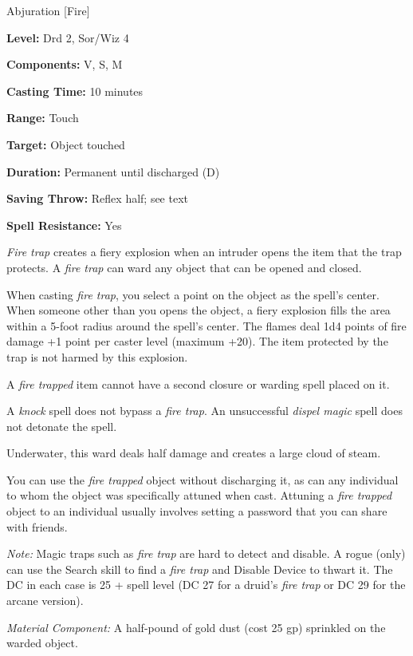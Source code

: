 
Abjuration [Fire]

\textbf{Level:} Drd 2, Sor/Wiz 4

\textbf{Components:} V, S, M

\textbf{Casting Time:} 10 minutes

\textbf{Range:} Touch

\textbf{Target:} Object touched

\textbf{Duration:} Permanent until discharged (D)

\textbf{Saving Throw:} Reflex half; see text

\textbf{Spell Resistance:} Yes

\textit{Fire trap} creates a fiery explosion when an intruder opens the item that 
the trap protects. A \textit{fire trap} can ward any object that can be opened 
and closed.

When casting \textit{fire trap}, you select a point on the object as the spell's 
center. When someone other than you opens the object, a fiery explosion fills the 
area within a 5-foot radius around the spell's center. The flames deal 1d4 points 
of fire damage +1 point per caster level (maximum +20). The item protected by the 
trap is not harmed by this explosion.

A \textit{fire trapped} item cannot have a second closure or warding spell placed 
on it.

A \textit{knock} spell does not bypass a \textit{fire trap}.  An unsuccessful \textit{dispel 
magic} spell does not detonate the spell.

Underwater, this ward deals half damage and creates a large cloud of steam.

You can use the \textit{fire trapped} object without discharging it, as can any 
individual to whom the object was specifically attuned when cast. Attuning a \textit{fire 
trapped} object to an individual usually involves setting a password that you can 
share with friends.

\textit{Note:} Magic traps such as \textit{fire trap} are hard to detect and disable. 
A rogue (only) can use the Search skill to find a \textit{fire trap} and Disable 
Device to thwart it. The DC in each case is 25 + spell level (DC 27 for a druid's 
\textit{fire trap} or DC 29 for the arcane version).

\textit{Material Component:} A half-pound of gold dust (cost 25 gp) sprinkled on 
the warded object.

